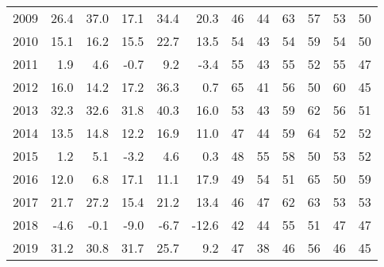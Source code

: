 \documentclass{article}
\begin{document}
\begin{table}[!ht]
\begin{tabular}{l || rrr || rr || cc||cc||cc}
        2009 & 26.4 & \cellcolor{green!25}37.0 & \cellcolor{red!25}17.1 & \cellcolor{green!25}34.4 & 20.3 & \cellcolor{green!25}46 & 44 & \cellcolor{green!25}63 & 57 & \cellcolor{green!25}53 & 50 \\ 
        2010 & \cellcolor{red!25}15.1 & \cellcolor{green!25}16.2 & 15.5 & \cellcolor{green!25}22.7 & 13.5 & \cellcolor{green!25}54 & 43 & 54 & \cellcolor{green!25}59 & \cellcolor{green!25}54 & 50 \\ 
        2011 & 1.9 & \cellcolor{green!25}4.6 & \cellcolor{red!25}-0.7 & \cellcolor{green!25}9.2 & -3.4 & \cellcolor{green!25}55 & 43 & \cellcolor{green!25}55 & 52 & \cellcolor{green!25}55 & 47 \\ 
        2012 & 16.0 & \cellcolor{red!25}14.2 & \cellcolor{green!25}17.2 & \cellcolor{green!25}36.3 & 0.7 & \cellcolor{green!25}65 & 41 & \cellcolor{green!25}56 & 50 & \cellcolor{green!25}60 & 45 \\ 
        2013 & 32.3 & \cellcolor{green!25}32.6 & \cellcolor{red!25}31.8 & \cellcolor{green!25}40.3 & 16.0 & \cellcolor{green!25}53 & 43 & 59 & \cellcolor{green!25}62 & \cellcolor{green!25}56 & 51 \\ 
        2014 & 13.5 & \cellcolor{green!25}14.8 & \cellcolor{red!25}12.2 & \cellcolor{green!25}16.9 & 11.0 & \cellcolor{green!25}47 & 44 & 59 & \cellcolor{green!25}64 & \cellcolor{green!25}52 & \cellcolor{green!25}52 \\ 
        2015 & 1.2 & \cellcolor{green!25}5.1 & \cellcolor{red!25}-3.2 & \cellcolor{green!25}4.6 & 0.3 & 48 & \cellcolor{green!25}55 & \cellcolor{green!25}58 & 50 & \cellcolor{green!25}53 & 52 \\ 
        2016 & 12.0 & \cellcolor{red!25}6.8 & \cellcolor{green!25}17.1 & 11.1 & \cellcolor{green!25}17.9 & 49 & \cellcolor{green!25}54 & 51 & \cellcolor{green!25}65 & 50 & \cellcolor{green!25}59 \\ 
        2017 & 21.7 & \cellcolor{green!25}27.2 & \cellcolor{red!25}15.4 & \cellcolor{green!25}21.2 & 13.4 & 46 & \cellcolor{green!25}47 & 62 & \cellcolor{green!25}63 & \cellcolor{green!25}53 & \cellcolor{green!25}53 \\ 
        2018 & -4.6 & \cellcolor{green!25}-0.1 & \cellcolor{red!25}-9.0 & \cellcolor{green!25}-6.7 & -12.6 & 42 & \cellcolor{green!25}44 & \cellcolor{green!25}55 & 51 & \cellcolor{green!25}47 & \cellcolor{green!25}47 \\ 
        2019 & 31.2 & \cellcolor{red!25}30.8 & \cellcolor{green!25}31.7 & \cellcolor{green!25}25.7 & 9.2 & \cellcolor{green!25}47 & 38 & 46 & \cellcolor{green!25}56 & \cellcolor{green!25}46 & 45 \\ 

\end{tabular}
\end{table}
\end{document}
